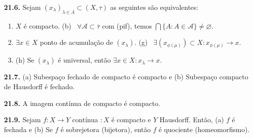 \begin{theorem}
    \textbf{21.6.} Sejam \((x_\lambda)_{\lambda \in \Lambda} \subset (X, \tau)\) as seguintes são equivalentes: 
    \vspace{-0.3cm}
    \begin{enumerate}[label = (\alph*), left = 0.6cm]
        \item \(X\) é compacto. \hfill (b) \  \(\forall \mathcal{A}\subset \overline{\tau}\) com (pif), temos \(\displaystyle \bigcap \{A : A \in \mathcal{A}\} \neq \varnothing\). 
        \item[(f)] \(\exists x \in X\) ponto de acumulação de \((x_\lambda)\). \hfill (g) \ \(\exists (x_{\phi(\mu)})\subset X : x_{\phi(\mu)} \to x\). 
        \item[] \hspace{2cm}(h) Se \((x_\lambda)\) é universal, então \(\exists x \in X : x_\lambda \to x\).  
    \end{enumerate}
\end{theorem}
\vspace{-0.1cm}

\hypertarget{prop217}{}
\begin{proposition}
    \textbf{21.7.} (a) Subespaço fechado de compacto é compacto e (b) Subespaço compacto de Hausdorff é fechado. 
\end{proposition}


\hypertarget{prop218}{}
\begin{proposition}
    \textbf{21.8.} A imagem contínua de compacto é compacto. 
\end{proposition}

\begin{corollary}
    \textbf{21.9.} Sejam \(f : X\to Y\) contínua \(: X \) é compacto e \(Y\) Hausdorff. Então, (a) \(f\) é fechada e (b) Se \(f \) é sobrejetora (bijetora), então \(f\) é quociente (homeomorfismo).
\end{corollary}

